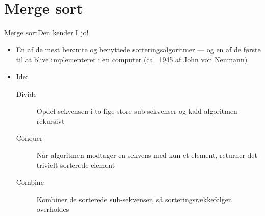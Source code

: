 \documentclass[aspectratio=1610]{beamer}
\begin{document}
\section{Merge sort}

\begin{frame}{Merge sort}{Den kender I jo!}
    \begin{itemize}
        \item En af de mest berømte og benyttede sorteringsalgoritmer --- og en
            af de første til at blive implementeret i en computer (ca.\ 1945 af
            John von Neumann)
        \item Ide:
            \begin{description}
                \item[Divide] Opdel sekvensen i to lige store sub-sekvenser og kald
                    algoritmen rekursivt
                \item[Conquer] Når algoritmen modtager en sekvens med kun et element,
                    returner det trivielt sorterede element
                \item[Combine] Kombiner de sorterede sub-sekvenser, så
                    sorteringsrækkefølgen overholdes
            \end{description}
    \end{itemize}
\end{frame}
\end{document}
